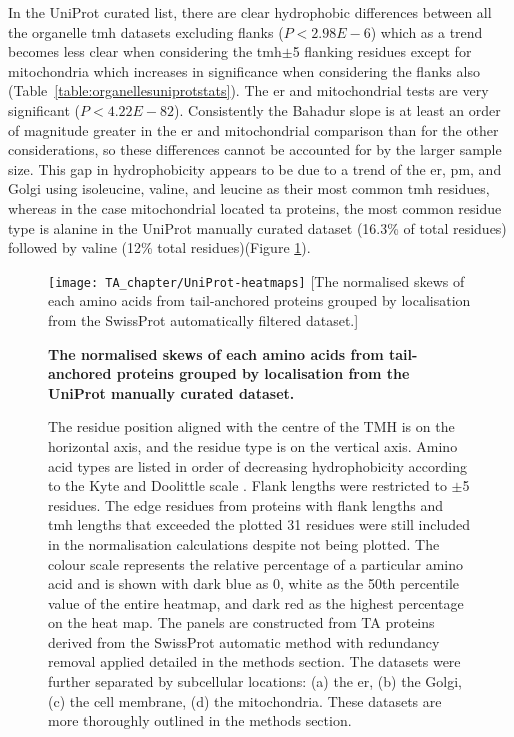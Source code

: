 In the UniProt curated list, there are clear hydrophobic differences between all the organelle \gls{tmh} datasets excluding flanks ($P<2.98E-6$) which as a trend becomes less clear when considering the \gls{tmh}$\pm$5 flanking residues except for mitochondria which increases in significance when considering the flanks also (Table~\ref{table:organellesuniprotstats}).
The \gls{er} and mitochondrial tests are very significant ($P<4.22E-82$).
Consistently the Bahadur slope is at least an order of magnitude greater in the \gls{er} and mitochondrial comparison than for the other considerations, so these differences cannot be accounted for by the larger sample size.
This gap in hydrophobicity appears to be due to a trend of the \gls{er}, \gls{pm}, and Golgi using isoleucine, valine, and leucine as their most common \gls{tmh} residues, whereas in the case mitochondrial located \gls{ta} proteins, the most common residue type is alanine in the UniProt manually curated dataset (16.3\% of total residues) followed by valine (12\% total residues)(Figure \ref{fig:uniprot-heatmap}).

\begin{figure}
\centering
\texttt{[image: TA\_chapter/UniProt-heatmaps]}
[The normalised skews of each amino acids from tail\--anchored proteins grouped by localisation from the SwissProt automatically filtered dataset.]
{\textbf{The normalised skews of each amino acids from tail\--anchored proteins grouped by localisation from the UniProt manually curated dataset.}

The residue position aligned with the centre of the TMH is on the horizontal axis, and the residue type is on the vertical axis.
Amino acid types are listed in order of decreasing hydrophobicity according to the Kyte and Doolittle scale \cite{Kyte1982}.
Flank lengths were restricted to $\pm$5 residues.
The edge residues from proteins with flank lengths and \gls{tmh} lengths that exceeded the plotted 31 residues were still included in the normalisation calculations despite not being plotted.
The colour scale represents the relative percentage of a particular amino acid and is shown with dark blue as 0, white as the 50th percentile value of the entire heatmap, and dark red as the highest percentage on the heat map.
The panels are constructed from TA proteins derived from the SwissProt automatic method with redundancy removal applied detailed in the methods section.
The datasets were further separated by subcellular locations: (a) the \gls{er}, (b) the Golgi, (c) the cell membrane, (d) the mitochondria.
These datasets are more thoroughly outlined in the methods section.
}

\label{fig:uniprot-heatmap}
\end{figure}

